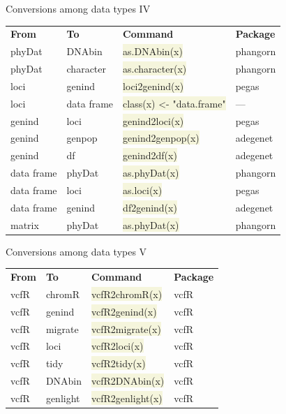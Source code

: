 \documentclass[compress, xelatex, 11pt, xcolor=svgnames, aspectratio=169, url={hyphens, lowtilde}]{beamer}
\renewcommand{\texttt}[1]{\colorbox{Beige}{{\ttfamily #1}}}
\begin{document}
\begin{frame}{Conversions among data types IV}
	\begin{tabular}{llll}
		\textbf{From} & \textbf{To} & \textbf{Command} & \textbf{Package}\\
		phyDat & DNAbin & \texttt{as.DNAbin(x)} & phangorn\\
		phyDat & character & \texttt{as.character(x)} & phangorn\\
		loci & genind & \texttt{loci2genind(x)} & pegas\\
		loci & data frame & \texttt{class(x) <- "data.frame"} & --- \\
		genind & loci & \texttt{genind2loci(x)} & pegas\\
		genind & genpop & \texttt{genind2genpop(x)} & adegenet\\
		genind & df & \texttt{genind2df(x)} & adegenet\\
		data frame & phyDat & \texttt{as.phyDat(x)} & phangorn\\
		data frame & loci & \texttt{as.loci(x)} & pegas\\
		data frame & genind & \texttt{df2genind(x)} & adegenet\\
		matrix & phyDat & \texttt{as.phyDat(x)} & phangorn
	\end{tabular}
\end{frame}

\begin{frame}{Conversions among data types V}
	\begin{tabular}{llll}
		\textbf{From} & \textbf{To} & \textbf{Command} & \textbf{Package}\\
		vcfR & chromR & \texttt{vcfR2chromR(x)} & vcfR\\
		vcfR & genind & \texttt{vcfR2genind(x)} & vcfR\\
		vcfR & migrate & \texttt{vcfR2migrate(x)} & vcfR\\
		vcfR & loci & \texttt{vcfR2loci(x)} & vcfR\\
		vcfR & tidy & \texttt{vcfR2tidy(x)} & vcfR\\
		vcfR & DNAbin & \texttt{vcfR2DNAbin(x)} & vcfR\\
		vcfR & genlight & \texttt{vcfR2genlight(x)} & vcfR
	\end{tabular}
\end{frame}
\end{document}
